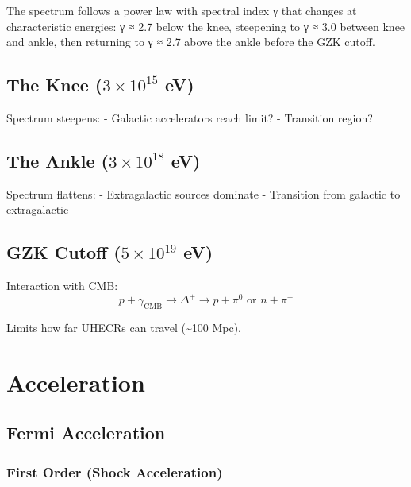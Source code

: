 \documentclass[
  11pt,
  letterpaper,
  twoside,
  openright]{book}
\begin{document}
The spectrum follows a power law with spectral index γ that changes at
characteristic energies: γ ≈ 2.7 below the knee, steepening to γ ≈ 3.0
between knee and ankle, then returning to γ ≈ 2.7 above the ankle before
the GZK cutoff.

\subsection{\texorpdfstring{The Knee (\(3 \times 10^{15}\)
eV)}{The Knee (3 \textbackslash times 10\^{}\{15\} eV)}}\label{the-knee-3-times-1015-ev}

Spectrum steepens: - Galactic accelerators reach limit? - Transition
region?

\subsection{\texorpdfstring{The Ankle (\(3 \times 10^{18}\)
eV)}{The Ankle (3 \textbackslash times 10\^{}\{18\} eV)}}\label{the-ankle-3-times-1018-ev}

Spectrum flattens: - Extragalactic sources dominate - Transition from
galactic to extragalactic

\subsection{\texorpdfstring{GZK Cutoff (\(5 \times 10^{19}\)
eV)}{GZK Cutoff (5 \textbackslash times 10\^{}\{19\} eV)}}\label{gzk-cutoff-5-times-1019-ev}

Interaction with CMB: \[
p + \gamma_{\text{CMB}} \rightarrow \Delta^+ \rightarrow p + \pi^0 \text{ or } n + \pi^+
\]

Limits how far UHECRs can travel (\textasciitilde100 Mpc).

\section{Acceleration}\label{acceleration}

\subsection{Fermi Acceleration}\label{fermi-acceleration}

\subsubsection{First Order (Shock
Acceleration)}\label{first-order-shock-acceleration}
\end{document}
